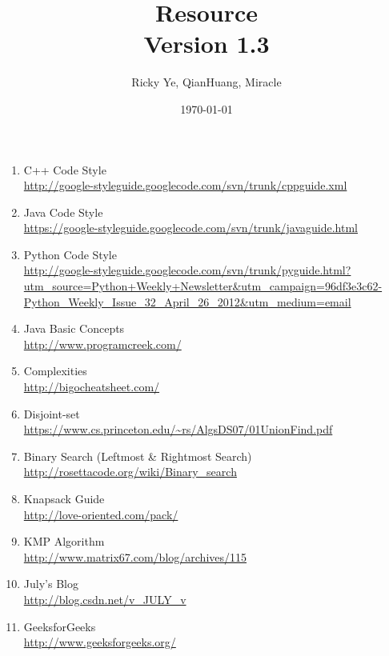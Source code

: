\documentclass[paper=a4, fontsize=11pt]{scrartcl} %
\begin{document}
\title{Resource\\\textnormal{\small{Version 1.3}}}
\author{Ricky Ye, QianHuang, Miracle}
\date{\today}
\maketitle

\begin{enumerate}[label=\upshape(\arabic*\upshape)]
  \item C++ Code Style\\ \url{http://google-styleguide.googlecode.com/svn/trunk/cppguide.xml}
  \item Java Code Style\\ \url{https://google-styleguide.googlecode.com/svn/trunk/javaguide.html}
  \item Python Code Style\\ \url{http://google-styleguide.googlecode.com/svn/trunk/pyguide.html?utm_source=Python+Weekly+Newsletter&utm_campaign=96df3e3c62-Python_Weekly_Issue_32_April_26_2012&utm_medium=email}
  \item Java Basic Concepts\\ \url{http://www.programcreek.com/}
  \item Complexities\\ \url{http://bigocheatsheet.com/}
  \item Disjoint-set\\ \url{https://www.cs.princeton.edu/~rs/AlgsDS07/01UnionFind.pdf}
  \item Binary Search (Leftmost \& Rightmost Search)\\ \url{http://rosettacode.org/wiki/Binary_search} 
  \item Knapsack Guide\\ \url{http://love-oriented.com/pack/}
  \item KMP Algorithm\\ \url{http://www.matrix67.com/blog/archives/115}
  \item July's Blog\\ \url{http://blog.csdn.net/v_JULY_v}
  \item GeeksforGeeks\\ \url{http://www.geeksforgeeks.org/}
\end{enumerate}
\end{document}
